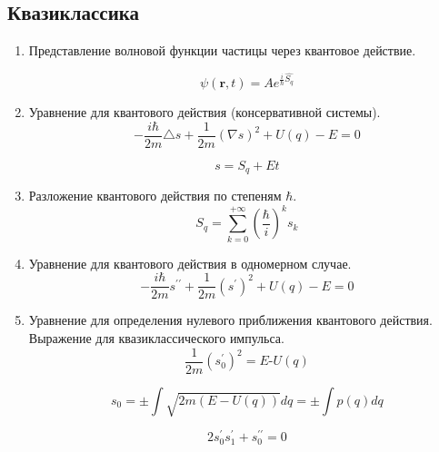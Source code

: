 \documentclass{article}
\begin{document}
{}

\subsection*{Квазиклассика}
	\begin{enumerate}
		\item {Представление волновой функции частицы через квантовое действие.}

\begin{equation}
\psi(\boldsymbol{r},t)=Ae^{\frac{i}{\hbar}\hat{S_{q}}}
\end{equation}


		\item {Уравнение для квантового действия (консервативной системы).}
\begin{equation}
-\frac{i\hbar}{2m}\triangle s+\frac{1}{2m}(\nabla s)^{2}+U(q)-E=0
\end{equation}


\begin{equation}
s=S_{q}+Et
\end{equation}


		\item {Разложение квантового действия по степеням $\hbar$.}
\begin{equation}
S_{q}=\sum_{k=0}^{+\infty}(\frac{\hbar}{i})^{k}s_{k}
\end{equation}


		\item {Уравнение для квантового действия в одномерном случае.} 
\begin{equation}
-\frac{i\hbar}{2m}s^{\prime\prime}+\frac{1}{2m}(s^{\prime})^{2}+U(q)-E=0
\end{equation}


		\item {Уравнение для определения нулевого приближения квантового действия. Выражение для квазиклассического импульса.}  
\begin{equation}
\frac{1}{2m}(s_{0}^{\prime})^{2}=E\text{-}U(q)
\end{equation}


\begin{equation}
s_{0}=\pm\int\sqrt{2m(E-U(q))}dq=\pm\int p(q)dq
\end{equation}


\begin{equation}
2s{}_{0}^{\prime}s{}_{1}^{\prime}+s{}_{0}^{\prime\prime}=0
\end{equation}



\end{enumerate}
\end{document}
